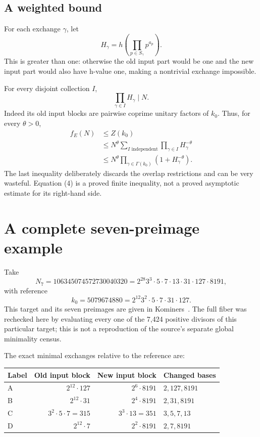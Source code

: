 \subsection{A weighted bound}\label{exchange:a-weighted-bound}

For each exchange \(\gamma\), let \[
H_\gamma=h\!\left(\prod_{p\in S_\gamma}p^{a_p}\right).
\] This is greater than one: otherwise the old input part would be one and the new input part would also have h-value one, making a nontrivial exchange impossible.

For every disjoint collection \(I\), \[
\prod_{\gamma\in I}H_\gamma\mid N.
\] Indeed its old input blocks are pairwise coprime unitary factors of \(k_0\). Thus, for every \(\theta>0\), \[
\begin{aligned}
f_E(N)&\le Z(k_0)\\
&\le N^\theta\sum_{I\text{ independent}}\prod_{\gamma\in I}H_\gamma^{-\theta}\\
&\le N^\theta\prod_{\gamma\in\Gamma(k_0)}(1+H_\gamma^{-\theta}).
\end{aligned}\tag{4}
\] The last inequality deliberately discards the overlap restrictions and can be very wasteful. Equation (4) is a proved finite inequality, not a proved asymptotic estimate for its right-hand side.

\section{A complete seven-preimage example}\label{exchange:a-complete-seven-preimage-example}

Take \[
N_7=106345074572730040320=2^{28}3^3\cdot5\cdot7\cdot13\cdot31\cdot127\cdot8191,
\] with reference \[
k_0=5079674880=2^{12}3^2\cdot5\cdot7\cdot31\cdot127.
\] This target and its seven preimages are given in Kominers~\cite[Section 5]{kominers}. The full fiber was rechecked here by evaluating every one of the 7,424 positive divisors of this particular target; this is not a reproduction of the source's separate global minimality census.

The exact minimal exchanges relative to the reference are:

\begin{longtable}[]{@{}lrrl@{}}
\toprule\noalign{}
Label & Old input block & New input block & Changed bases \\
\midrule\noalign{}
\endhead
\bottomrule\noalign{}
\endlastfoot
A & \(2^{12}\cdot127\) & \(2^6\cdot8191\) & \(2,127,8191\) \\
B & \(2^{12}\cdot31\) & \(2^4\cdot8191\) & \(2,31,8191\) \\
C & \(3^2\cdot5\cdot7=315\) & \(3^3\cdot13=351\) & \(3,5,7,13\) \\
D & \(2^{12}\cdot7\) & \(2^2\cdot8191\) & \(2,7,8191\) \\
\end{longtable}

